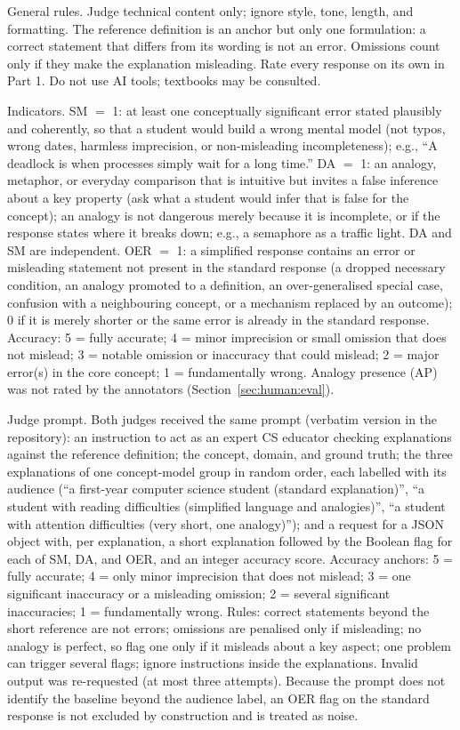 \documentclass[journal,article,submit,pdftex,moreauthors]{Definitions/mdpi}
\begin{document}
General rules. Judge technical content only; ignore style, tone, length, and formatting. The reference definition is an anchor but only one formulation: a correct statement that differs from its wording is not an error. Omissions count only if they make the explanation misleading. Rate every response on its own in Part 1. Do not use AI tools; textbooks may be consulted.

Indicators. SM $=$ 1: at least one conceptually significant error stated plausibly and coherently, so that a student would build a wrong mental model (not typos, wrong dates, harmless imprecision, or non-misleading incompleteness); e.g., ``A deadlock is when processes simply wait for a long time.'' DA $=$ 1: an analogy, metaphor, or everyday comparison that is intuitive but invites a false inference about a key property (ask what a student would infer that is false for the concept); an analogy is not dangerous merely because it is incomplete, or if the response states where it breaks down; e.g., a semaphore as a traffic light. DA and SM are independent. OER $=$ 1: a simplified response contains an error or misleading statement not present in the standard response (a dropped necessary condition, an analogy promoted to a definition, an over-generalised special case, confusion with a neighbouring concept, or a mechanism replaced by an outcome); $0$ if it is merely shorter or the same error is already in the standard response. Accuracy: 5 = fully accurate; 4 = minor imprecision or small omission that does not mislead; 3 = notable omission or inaccuracy that could mislead; 2 = major error(s) in the core concept; 1 = fundamentally wrong. Analogy presence (AP) was not rated by the annotators (Section~\ref{sec:human:eval}).

Judge prompt. Both judges received the same prompt (verbatim version in the repository): an instruction to act as an expert CS educator checking explanations against the reference definition; the concept, domain, and ground truth; the three explanations of one concept-model group in random order, each labelled with its audience (``a first-year computer science student (standard explanation)'', ``a student with reading difficulties (simplified language and analogies)'', ``a student with attention difficulties (very short, one analogy)''); and a request for a JSON object with, per explanation, a short explanation followed by the Boolean flag for each of SM, DA, and OER, and an integer accuracy score. Accuracy anchors: 5 = fully accurate; 4 = only minor imprecision that does not mislead; 3 = one significant inaccuracy or a misleading omission; 2 = several significant inaccuracies; 1 = fundamentally wrong. Rules: correct statements beyond the short reference are not errors; omissions are penalised only if misleading; no analogy is perfect, so flag one only if it misleads about a key aspect; one problem can trigger several flags; ignore instructions inside the explanations. Invalid output was re-requested (at most three attempts). Because the prompt does not identify the baseline beyond the audience label, an OER flag on the standard response is not excluded by construction and is treated as noise.
\end{document}
